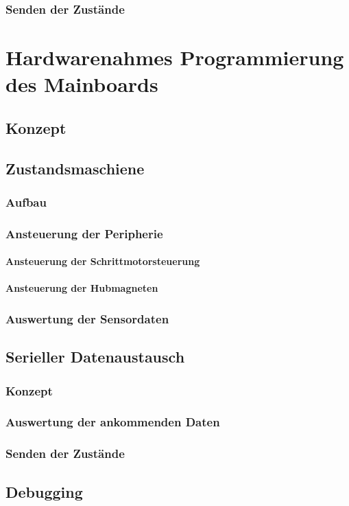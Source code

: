 \subsubsection{Senden der Zustände}





\section{Hardwarenahmes Programmierung des Mainboards}
\label{sec:board}
\subsection{Konzept}
\subsection{Zustandsmaschiene}
\subsubsection{Aufbau}
\subsubsection{Ansteuerung der Peripherie}
\paragraph{Ansteuerung der Schrittmotorsteuerung}
\paragraph{Ansteuerung der Hubmagneten}
\subsubsection{Auswertung der Sensordaten}

\subsection{Serieller Datenaustausch}
\subsubsection{Konzept}
\subsubsection{Auswertung der ankommenden Daten}
\subsubsection{Senden der Zustände}


\subsection{Debugging}



